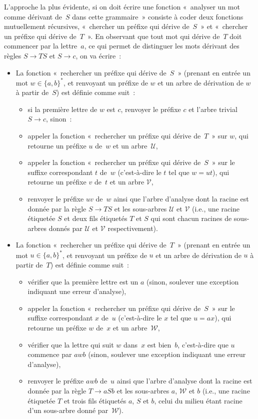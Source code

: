 \documentclass[12pt,a4paper]{article}
\theoremstyle{definition}
\begin{document}
L'approche la plus évidente, si on doit écrire une fonction « analyser
un mot comme dérivant de $S$ dans cette grammaire » consiste à coder
deux fonctions mutuellement récursives, « chercher un préfixe qui
dérive de $S$ » et « chercher un préfixe qui dérive de $T$ ».  En
observant que tout mot qui dérive de $T$ doit commencer par la
lettre $a$, ce qui permet de distinguer les mots dérivant des règles
$S\rightarrow TS$ et $S\rightarrow c$, on va écrire :
\begin{itemize}
\item La fonction « rechercher un préfixe qui dérive de $S$ » (prenant
  en entrée un mot $w\in\{a,b\}^*$, et renvoyant un préfixe de $w$ et
  un arbre de dérivation de $w$ à partir de $S$) est définie comme
  suit :
\begin{itemize}
\item si la première lettre de $w$ est $c$, renvoyer le préfixe $c$ et
  l'arbre trivial $S\to c$, sinon :
\item appeler la fonction « rechercher un préfixe qui dérive
  de $T$ » sur $w$, qui retourne un préfixe $u$ de $w$ et un
  arbre $\mathscr{U}$,
\item appeler la fonction « rechercher un préfixe qui dérive de $S$ »
  sur le suffixe correspondant $t$ de $w$ (c'est-à-dire le $t$ tel que
  $w=ut$), qui retourne un préfixe $v$ de $t$ et un arbre
  $\mathscr{V}$,
\item renvoyer le préfixe $uv$ de $w$ ainsi que l'arbre d'analyse dont
  la racine est donnée par la règle $S\rightarrow TS$ et les
  sous-arbres $\mathscr{U}$ et $\mathscr{V}$ (i.e., une racine
  étiquetée $S$ et deux fils étiquetés $T$ et $S$ qui sont chacun
  racines de sous-arbres donnés par $\mathscr{U}$ et $\mathscr{V}$
  respectivement).
\end{itemize}
\item La fonction « rechercher un préfixe qui dérive de $T$ » (prenant
  en entrée un mot $u\in\{a,b\}^*$, et renvoyant un préfixe de $u$ et
  un arbre de dérivation de $u$ à partir de $T$) est définie comme
  suit :
\begin{itemize}
\item vérifier que la première lettre est un $a$ (sinon, soulever une
  exception indiquant une erreur d'analyse),
\item appeler la fonction « rechercher un préfixe qui dérive de $S$ »
  sur le suffixe correspondant $x$ de $u$ (c'est-à-dire le $x$ tel que
  $u=ax$), qui retourne un préfixe $w$ de $x$ et un
  arbre $\mathscr{W}$,
\item vérifier que la lettre qui suit $w$ dans $x$ est bien $b$,
  c'est-à-dire que $u$ commence par $awb$ (sinon, soulever une
  exception indiquant une erreur d'analyse),
\item renvoyer le préfixe $awb$ de $u$ ainsi que l'arbre d'analyse
  dont la racine est donnée par la règle $T\rightarrow aSb$ et les
  sous-arbres $a$, $\mathscr{W}$ et $b$ (i.e., une racine étiquetée
  $T$ et trois fils étiquetés $a$, $S$ et $b$, celui du milieu étant
  racine d'un sous-arbre donné par $\mathscr{W}$).
\end{itemize}
\end{itemize}
\end{document}
